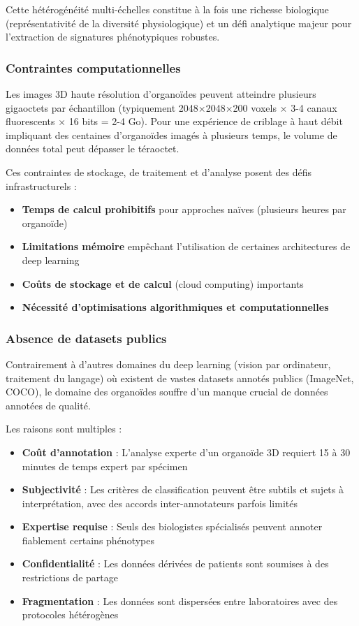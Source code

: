 Cette hétérogénéité multi-échelles constitue à la fois une richesse biologique (représentativité de la diversité physiologique) et un défi analytique majeur pour l'extraction de signatures phénotypiques robustes.

\subsubsection{Contraintes computationnelles}

Les images 3D haute résolution d'organoïdes peuvent atteindre plusieurs gigaoctets par échantillon (typiquement 2048×2048×200 voxels × 3-4 canaux fluorescents × 16 bits = 2-4 Go). Pour une expérience de criblage à haut débit impliquant des centaines d'organoïdes imagés à plusieurs temps, le volume de données total peut dépasser le téraoctet.

Ces contraintes de stockage, de traitement et d'analyse posent des défis infrastructurels :
\begin{itemize}
    \item \textbf{Temps de calcul prohibitifs} pour approches naïves (plusieurs heures par organoïde)
    \item \textbf{Limitations mémoire} empêchant l'utilisation de certaines architectures de deep learning
    \item \textbf{Coûts de stockage et de calcul} (cloud computing) importants
    \item \textbf{Nécessité d'optimisations algorithmiques et computationnelles}
\end{itemize}

\subsubsection{Absence de datasets publics}

Contrairement à d'autres domaines du deep learning (vision par ordinateur, traitement du langage) où existent de vastes datasets annotés publics (ImageNet, COCO), le domaine des organoïdes souffre d'un manque crucial de données annotées de qualité.

Les raisons sont multiples :
\begin{itemize}
    \item \textbf{Coût d'annotation} : L'analyse experte d'un organoïde 3D requiert 15 à 30 minutes de temps expert par spécimen
    \item \textbf{Subjectivité} : Les critères de classification peuvent être subtils et sujets à interprétation, avec des accords inter-annotateurs parfois limités
    \item \textbf{Expertise requise} : Seuls des biologistes spécialisés peuvent annoter fiablement certains phénotypes
    \item \textbf{Confidentialité} : Les données dérivées de patients sont soumises à des restrictions de partage
    \item \textbf{Fragmentation} : Les données sont dispersées entre laboratoires avec des protocoles hétérogènes
\end{itemize}

